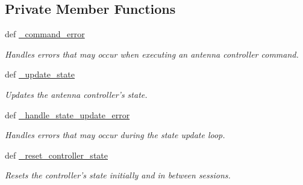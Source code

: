 \subsection*{Private Member Functions}
\begin{DoxyCompactItemize}
\item 
def \hyperlink{classhwm_1_1hardware_1_1devices_1_1drivers_1_1mxl__antenna__controller_1_1mxl__antenna__controll300dc396624a0e0bda412a3b1ecea20c_a634f2fc719c0790de10a2c63c8f5afa0}{\-\_\-command\-\_\-error}
\begin{DoxyCompactList}\small\item\em Handles errors that may occur when executing an antenna controller command. \end{DoxyCompactList}\item 
def \hyperlink{classhwm_1_1hardware_1_1devices_1_1drivers_1_1mxl__antenna__controller_1_1mxl__antenna__controll300dc396624a0e0bda412a3b1ecea20c_a5431aeefc10c047be5ef904c007de4cf}{\-\_\-update\-\_\-state}
\begin{DoxyCompactList}\small\item\em Updates the antenna controller's state. \end{DoxyCompactList}\item 
def \hyperlink{classhwm_1_1hardware_1_1devices_1_1drivers_1_1mxl__antenna__controller_1_1mxl__antenna__controll300dc396624a0e0bda412a3b1ecea20c_aaf0a8491d5c669bc8abc64a6793827eb}{\-\_\-handle\-\_\-state\-\_\-update\-\_\-error}
\begin{DoxyCompactList}\small\item\em Handles errors that may occur during the state update loop. \end{DoxyCompactList}\item 
\hypertarget{classhwm_1_1hardware_1_1devices_1_1drivers_1_1mxl__antenna__controller_1_1mxl__antenna__controll300dc396624a0e0bda412a3b1ecea20c_af21ad31336a8424bc92e4f61b1159fcd}{def \hyperlink{classhwm_1_1hardware_1_1devices_1_1drivers_1_1mxl__antenna__controller_1_1mxl__antenna__controll300dc396624a0e0bda412a3b1ecea20c_af21ad31336a8424bc92e4f61b1159fcd}{\-\_\-reset\-\_\-controller\-\_\-state}}\label{classhwm_1_1hardware_1_1devices_1_1drivers_1_1mxl__antenna__controller_1_1mxl__antenna__controll300dc396624a0e0bda412a3b1ecea20c_af21ad31336a8424bc92e4f61b1159fcd}

\begin{DoxyCompactList}\small\item\em Resets the controller's state initially and in between sessions. \end{DoxyCompactList}\end{DoxyCompactItemize}
